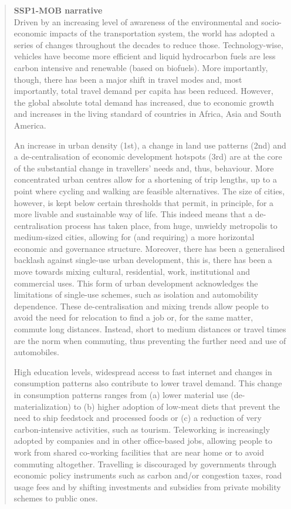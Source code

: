 \blockquote{\sffamily \textbf{SSP1-MOB narrative}\\Driven by an increasing level of awareness of the environmental and socio-economic impacts of the transportation system, the world has adopted a series of changes throughout the decades to reduce those. Technology-wise, vehicles have become more efficient and liquid hydrocarbon fuels are less carbon intensive and renewable (based on biofuels). More importantly, though, there has been a major shift in travel modes and, most importantly, total travel demand per capita has been reduced. However, the global absolute total demand has increased, due to economic growth and increases in the living standard of countries in Africa, Asia and South America.

An increase in urban density (1st), a change in land use patterns (2nd) and a de-centralisation of economic development hotspots (3rd) are at the core of the substantial change in travellers' needs and, thus, behaviour. More concentrated urban centres allow for a shortening of trip lengths, up to a point where cycling and walking are feasible alternatives. The size of cities, however, is kept below certain thresholds that permit, in principle, for a more livable and sustainable way of life. This indeed means that a de-centralisation process has taken place, from huge, unwieldy metropolis to medium-sized cities, allowing for (and requiring) a more horizontal economic and governance structure. Moreover, there has been a generalised backlash against single-use urban development, this is, there has been a move towards mixing cultural, residential, work, institutional and commercial uses. This form of urban development acknowledges the limitations of single-use schemes, such as isolation and automobility dependence. These de-centralisation and mixing trends allow people to avoid the need for relocation to find a job or, for the same matter, commute long distances. Instead, short to medium distances or travel times are the norm when commuting, thus preventing the further need and use of automobiles.

High education levels, widespread access to fast internet and changes in consumption patterns also contribute to lower travel demand. This change in consumption patterns ranges from (a) lower material use (de-materialization) to (b) higher adoption of low-meat diets that prevent the need to ship feedstock and processed foods or (c) a reduction of very carbon-intensive activities, such as tourism. Teleworking is increasingly adopted by companies and in other office-based jobs, allowing people to work from shared co-working facilities that are near home or to avoid commuting altogether. Travelling is discouraged by governments through economic policy instruments such as carbon and/or congestion taxes, road usage fees and by shifting investments and subsidies from private mobility schemes to public ones.

}
